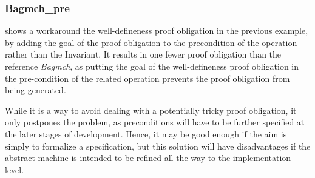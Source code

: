 \documentclass[12pt,journal,duplex]{IEEEtran}
\begin{document}
	\subsubsection{Bagmch\_pre} shows a workaround the well-defineness proof obligation in the previous example, by adding the goal of the proof obligation to the precondition of the operation rather than the Invariant. It results in one fewer proof obligation than the reference \emph{Bagmch}, as putting the goal of the well-defineness proof obligation in the pre-condition of the related operation prevents the proof obligation from being generated.

	While it is a way to avoid dealing with a potentially tricky proof obligation, it only postpones the problem, as preconditions will have to be further specified at the later stages of development. Hence, it may be good enough if the aim is simply to formalize a specification, but this solution will have disadvantages if the abstract machine is intended to be refined all the way to the implementation level.
\end{document}
